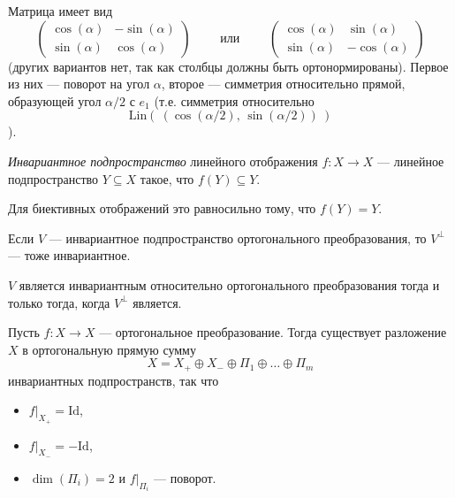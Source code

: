 \documentclass[12pt,a4paper]{article}
\newcommand{\Id}{\ensuremath{\mathrm{Id}}\xspace}
\newcommand{\Lin}{\ensuremath{\mathrm{Lin}}\xspace}
\begin{document}
    \begin{example}
        Матрица имеет вид
        \[
            \begin{pmatrix}
                \cos(\alpha)& -\sin(\alpha)\\
                \sin(\alpha)& \cos(\alpha)
            \end{pmatrix}
            \qquad\text{ или }\qquad
            \begin{pmatrix}
                \cos(\alpha)& \sin(\alpha)\\
                \sin(\alpha)& -\cos(\alpha)
            \end{pmatrix}
        \]
        (других вариантов нет, так как столбцы должны быть ортонормированы). Первое из них --- поворот на угол $\alpha$, второе --- симметрия относительно прямой, образующей угол $\alpha/2$ с $e_1$ (т.е. симметрия относительно
        \[\Lin(\ (\cos(\alpha/2),\, \sin(\alpha/2))\ )\]
        ).
    \end{example}

    \begin{definition}
        \emph{Инвариантное подпространство} линейного отображения $f: X \to X$ --- линейное подпространство $Y \subseteq X$ такое, что $f(Y) \subseteq Y$.
    \end{definition}

    \begin{remark}
        Для биективных отображений это равносильно тому, что $f(Y) = Y$.
    \end{remark}

    \begin{lemma}
        Если $V$ --- инвариантное подпространство ортогонального преобразования, то $V^\perp$ --- тоже инвариантное.
    \end{lemma}

    \begin{corollary}
        $V$ является инвариантным относительно ортогонального преобразования тогда и только тогда, когда $V^\perp$ является.
    \end{corollary}

    \begin{theorem}
        Пусть $f: X \to X$ --- ортогональное преобразование. Тогда существует разложение $X$ в ортогональную прямую сумму
        \[X = X_+ \oplus X_- \oplus \Pi_1 \oplus \dots \oplus \Pi_m\]
        инвариантных подпространств, так что
        \begin{itemize}
            \item $f|_{X_+} = \Id$,
            \item $f|_{X_-} = -\Id$,
            \item $\dim(\Pi_i) = 2$ и $f|_{\Pi_i}$ --- поворот.
        \end{itemize}
    \end{theorem}
\end{document}
